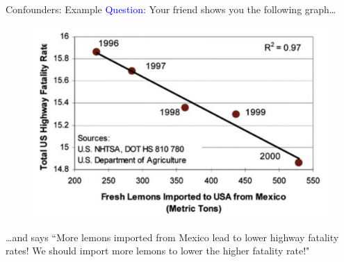 \documentclass[10pt,t]{beamer}
\begin{document}
\begin{frame}{Confounders: Example}
\vspace{-0.6cm}
\textcolor{blue}{Question}: Your friend shows you the following graph\dots

\vspace{0.1cm}

\begin{figure}
	\centering \includegraphics[scale=0.4]{lemons.png}
\end{figure}

\vspace{0.1cm} 

\dots and says ``More lemons imported from Mexico lead to lower highway fatality rates! We should import more lemons to lower the higher fatality rate!"



\end{frame}
\end{document}
